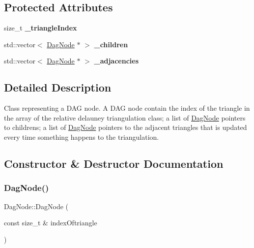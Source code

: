 \subsection*{Protected Attributes}
\begin{DoxyCompactItemize}
\item 
\mbox{\label{classDagNode_ac7d609f02e4b2bcd2c9636164496ce78}} 
size\+\_\+t {\bfseries \+\_\+triangle\+Index}
\item 
\mbox{\label{classDagNode_a35fd3faa2d6c1edb9d8c94817ec9634c}} 
std\+::vector$<$ \hyperlink{classDagNode}{Dag\+Node} $\ast$ $>$ {\bfseries \+\_\+children}
\item 
\mbox{\label{classDagNode_a5ff072d7f04f759ed8c039578faf0b98}} 
std\+::vector$<$ \hyperlink{classDagNode}{Dag\+Node} $\ast$ $>$ {\bfseries \+\_\+adjacencies}
\end{DoxyCompactItemize}


\subsection{Detailed Description}
Class representing a D\+AG node. A D\+AG node contain the index of the triangle in the array of the relative delauney triangulation class; a list of \hyperlink{classDagNode}{Dag\+Node} pointers to childrens; a list of \hyperlink{classDagNode}{Dag\+Node} pointers to the adjacent triangles that is updated every time something happens to the triangulation. 

\subsection{Constructor \& Destructor Documentation}
\mbox{\label{classDagNode_add2a400bc282195020af9e32ada5b427}} 
\subsubsection{\texorpdfstring{Dag\+Node()}{DagNode()}}
{\footnotesize\ttfamily Dag\+Node\+::\+Dag\+Node (\begin{DoxyParamCaption}\item[{const size\+\_\+t \&}]{index\+Oftriangle }\end{DoxyParamCaption})\hspace{0.3cm}{\ttfamily [inline]}}




